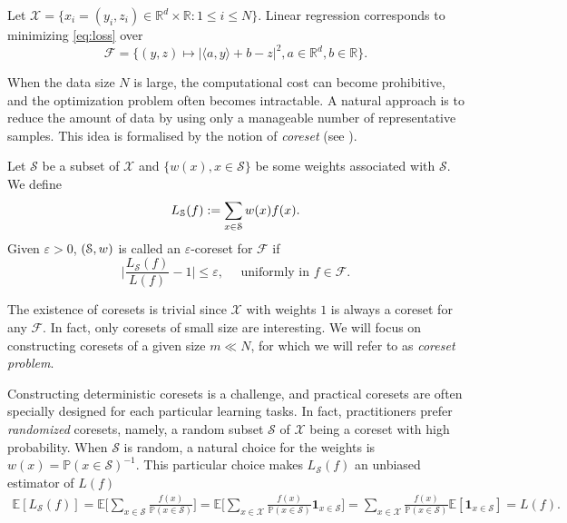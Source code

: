 \begin{example} \label{ex:linear}
    Let $\mathcal X = \{x_i = (y_i,z_i) \in \mathbb R^d\times \mathbb R: 1\le i \le N \} $. Linear regression corresponds to minimizing \eqref{eq:loss} over 
    \[ \mathcal F = \{(y,z)\mapsto |\langle a, y \rangle + b - z|^2 , a \in \mathbb R^d, b \in \mathbb R\}.\]
\end{example}

When the data size $N$ is large, the computational cost can become prohibitive, and the optimization problem often becomes intractable. A natural approach is to reduce the amount of data by using only a manageable number of representative samples. This idea is formalised by the notion of \textit{coreset} (see \cite{bachem2017coresetML}).
\begin{definition}[Coresets]
    Let $\mathcal S$ be a subset of $\mathcal X$ and $\{w(x),x\in \mathcal S\}$ be some weights associated with $\mathcal S$. We define
    \[L_{\mathcal{S}}(f):= \sum_{x\in \mathcal{S}} w(x) f(x).\]
    Given $\varepsilon>0$,  $(\mathcal{S},w)$ is called an $\varepsilon$-coreset for $\mathcal F$ if
    \[ \Big |\frac{L_{\mathcal S}(f)}{L(f)} - 1 \Big | \le \varepsilon, \quad \text{ uniformly in } f\in \mathcal F.\]
\end{definition}
The existence of coresets is trivial since $\mathcal X$ with weights $1$ is always a coreset for any $\mathcal F$. In fact, only coresets of small size are interesting. We will focus on constructing coresets of a given size $m \ll N$, for which we will refer to as \textit{coreset problem}.

Constructing deterministic coresets is a challenge, and practical coresets are often specially designed for each particular learning tasks. In fact, practitioners prefer \emph{randomized} coresets, namely, a random subset $\mathcal S$ of $\mathcal X$ being a coreset with high probability.  When $\mathcal S$ is random, a natural choice for the weights is $w(x) = \mathbb P(x\in \mathcal S)^{-1}$. This particular choice makes $L_{\mathcal S}(f)$ an unbiased estimator of $L(f)$ 
\begin{eqnarray*}
\mathbb E[L_{\mathcal S}(f)] = \mathbb E \Big [ \sum_{x\in \mathcal S} \frac{f(x)}{\mathbb P(x\in \mathcal S)} \Big ] 
=
\mathbb E \Big [ \sum_{x\in \mathcal X} \frac{f(x)}{\mathbb P(x\in \mathcal S)} \mathbf{1}_{x\in \mathcal S}\Big ] 
= \sum_{x\in \mathcal X} \frac{f(x)}{\mathbb P(x\in \mathcal S)}\mathbb E[\mathbf{1}_{x\in \mathcal S}] = L(f).    
\end{eqnarray*}

